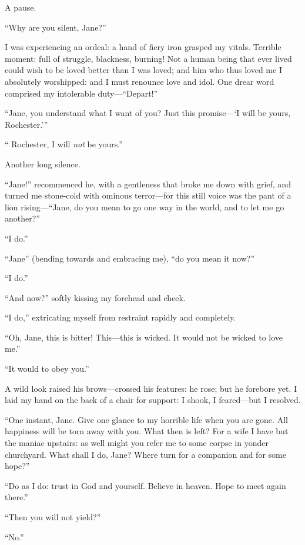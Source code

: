 A pause.

\enquote{Why are you silent, Jane?}

I was experiencing an ordeal: a hand of fiery iron grasped my vitals. 
Terrible moment: full of struggle, blackness, burning! Not a human
being that ever lived could wish to be loved better than I was loved;
and him who thus loved me I absolutely worshipped: and I must renounce
love and idol. One drear word comprised my intolerable
duty---\enquote{Depart!}

\enquote{Jane, you understand what I want of you? Just this
promise---\enquote{I will be yours, \Mr{} Rochester.}}

\enquote{\Mr{} Rochester, I will \emph{not} be yours.}

Another long silence.

\enquote{Jane!} recommenced he, with a gentleness that broke me down
with grief, and turned me stone-cold with ominous terror---for this
still voice was the pant of a lion rising---\enquote{Jane, do you mean
to go one way in the world, and to let me go another?}

\enquote{I do.}

\enquote{Jane} (bending towards and embracing me), \enquote{do you mean
it now?}

\enquote{I do.}

\enquote{And now?} softly kissing my forehead and cheek.

\enquote{I do,} extricating myself from restraint rapidly and
completely.

\enquote{Oh, Jane, this is bitter! This---this is wicked. It would not
be wicked to love me.}

\enquote{It would to obey you.}

A wild look raised his brows---crossed his features: he rose; but he
forebore yet. I laid my hand on the back of a chair for support: I
shook, I feared---but I resolved.

\enquote{One instant, Jane. Give one glance to my horrible life when
you are gone. All happiness will be torn away with you. What then is
left? For a wife I have but the maniac upstairs: as well might you
refer me to some corpse in yonder churchyard. What shall I do, Jane? 
Where turn for a companion and for some hope?}

\enquote{Do as I do: trust in God and yourself. Believe in heaven. 
Hope to meet again there.}

\enquote{Then you will not yield?}

\enquote{No.}

